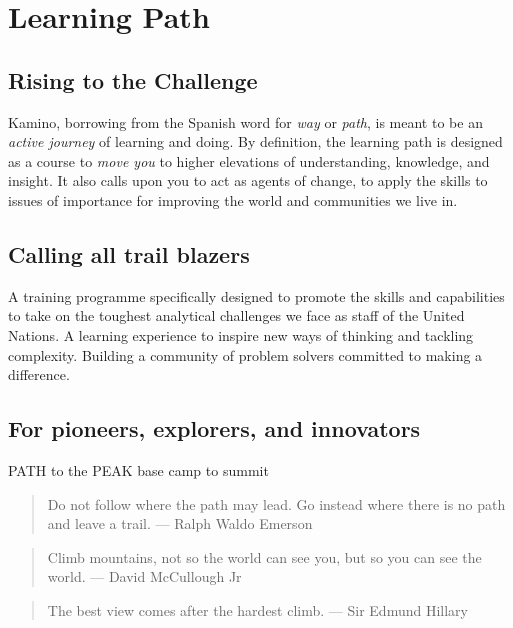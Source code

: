 \section{Learning Path}\label{basecamp-learning-path}

\subsection{Rising to the Challenge}\label{rising-to-the-challenge}

Kamino, borrowing from the Spanish word for \textit{way} or \textit{path}, is meant to be an \textit{active journey} of learning and doing.  By definition, the learning path is designed as a course to \textit{move you} to higher elevations of understanding, knowledge, and insight.  It also calls upon you to act as agents of change, to apply the skills to issues of importance for improving the world and communities we live in.

\subsection{Calling all trail blazers}\label{calling-all-trail-blazers}

A training programme specifically designed to promote the skills and capabilities to take on the toughest analytical challenges we face as staff of the United Nations. A learning experience to inspire new ways of thinking and tackling complexity. Building a community of problem solvers committed to making a difference.

\subsection{For pioneers, explorers, and innovators}\label{pioneers-innovators}

PATH to the PEAK
base camp to summit

\begin{quote}
Do not follow where the path may lead. Go instead where there is no path and leave a trail.
— Ralph Waldo Emerson
\end{quote}

\begin{quote}
Climb mountains, not so the world can see you, but so you can see the world.
— David McCullough Jr
\end{quote}

\begin{quote}
The best view comes after the hardest climb.
— Sir Edmund Hillary
\end{quote}

